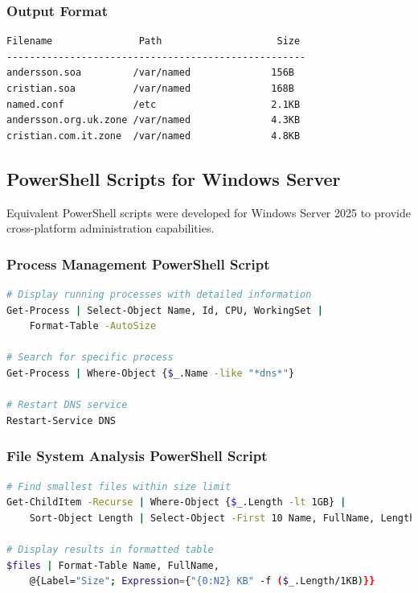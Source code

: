 \documentclass[12pt,a4paper]{article}
\begin{document}
\subsubsection{Output Format}
\begin{lstlisting}[language=bash, caption=File Analysis Output Example]
Filename               Path                    Size
----------------------------------------------------
andersson.soa         /var/named              156B
cristian.soa          /var/named              168B
named.conf            /etc                    2.1KB
andersson.org.uk.zone /var/named              4.3KB
cristian.com.it.zone  /var/named              4.8KB
\end{lstlisting}

\subsection{PowerShell Scripts for Windows Server}\label{subsec:powershell-scripts}

Equivalent PowerShell scripts were developed for Windows Server 2025 to provide cross-platform administration capabilities.

\subsubsection{Process Management PowerShell Script}
\begin{lstlisting}[language=bash, caption=Windows Process Management]
# Display running processes with detailed information
Get-Process | Select-Object Name, Id, CPU, WorkingSet | 
    Format-Table -AutoSize

# Search for specific process
Get-Process | Where-Object {$_.Name -like "*dns*"}

# Restart DNS service
Restart-Service DNS
\end{lstlisting}

\subsubsection{File System Analysis PowerShell Script}
\begin{lstlisting}[language=bash, caption=Windows File Analysis]
# Find smallest files within size limit
Get-ChildItem -Recurse | Where-Object {$_.Length -lt 1GB} | 
    Sort-Object Length | Select-Object -First 10 Name, FullName, Length

# Display results in formatted table
$files | Format-Table Name, FullName, 
    @{Label="Size"; Expression={"{0:N2} KB" -f ($_.Length/1KB)}}
\end{lstlisting}
\end{document}
